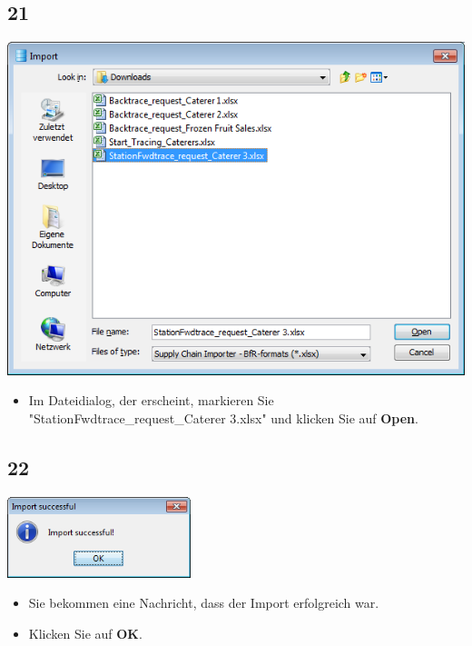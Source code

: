 \documentclass{beamer}
\begin{document}
\subsection{21}
\begin{frame}
	\begin{center}
  		\includegraphics[height=0.5\textheight]{21.png}
	\end{center}
	\begin{itemize}
		\item Im Dateidialog, der erscheint, markieren Sie "StationFwdtrace\_request\_Caterer 3.xlsx" und klicken Sie auf \textbf{Open}.		
	\end{itemize}
\end{frame}

\subsection{22}
\begin{frame}
	\begin{center}
  		\includegraphics[width=0.4\textwidth]{22.png}
	\end{center}
	\begin{itemize}
		\item Sie bekommen eine Nachricht, dass der Import erfolgreich war.
		\item Klicken Sie auf \textbf{OK}.
	\end{itemize}
\end{frame}
\end{document}
